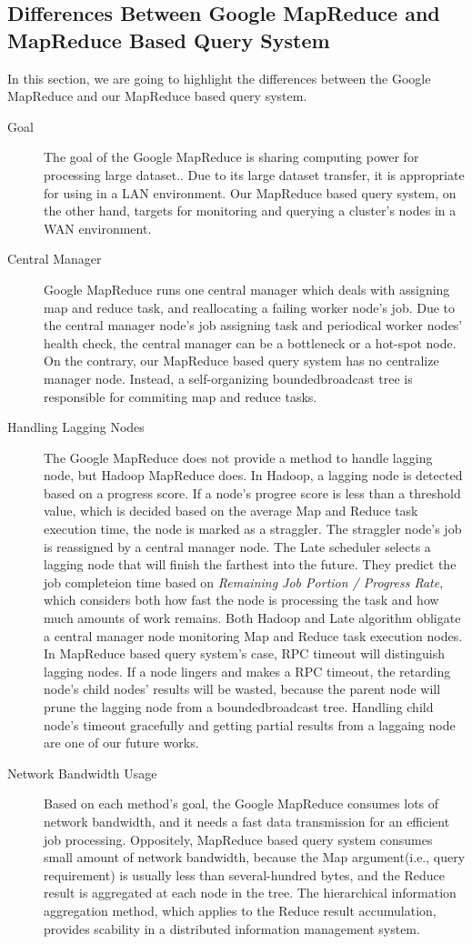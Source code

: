 \documentclass{acm_proc_article-sp}
\begin{document}
\subsection{Differences Between Google MapReduce and MapReduce Based Query System}
In this section, we are going to highlight the differences between the Google MapReduce and our MapReduce based query system.
\begin{description}
\item[Goal]The goal of the Google MapReduce is sharing computing power for processing large dataset.\cite{google_mapreduce}. Due to its large dataset transfer, it is appropriate for using in a LAN environment.
Our MapReduce based query system, on the other hand, targets for monitoring and querying a cluster's nodes in a WAN environment.
\item[Central Manager]Google MapReduce runs one central manager which deals with assigning map and reduce task, and reallocating a failing worker node's job.
Due to the central manager node's job assigning task and periodical worker nodes' health check, the central manager can be a bottleneck or a hot-spot node. 
On the contrary, our MapReduce based query system has no centralize manager node. Instead, a self-organizing boundedbroadcast tree is responsible for commiting map and reduce tasks.
\item[Handling Lagging Nodes]The Google MapReduce does not provide a method to handle lagging node, but Hadoop MapReduce does. In Hadoop, a lagging node is detected based on a progress score.
If a node's progree score is less than a threshold value, which is decided based on the average Map and Reduce task execution time, the node is marked as a straggler. The straggler node's job is reassigned by a central manager node.\cite{hadoop}
The Late scheduler\cite{late} selects a lagging node that will finish the farthest into the future. They predict the job completeion time based on \textit{Remaining Job Portion / Progress Rate}, which considers both
how fast the node is processing the task and how much amounts of work remains.
Both Hadoop and Late algorithm obligate a central manager node monitoring Map and Reduce task execution nodes. 
In MapReduce based query system's case, RPC timeout will distinguish lagging nodes. If a node lingers and makes a RPC timeout, the retarding node's child nodes' results will be wasted, 
because the parent node will prune the lagging node from a boundedbroadcast tree. Handling child node's timeout gracefully and getting partial results from a laggaing node are one of our future works.
\item[Network Bandwidth Usage]Based on each method's goal, the Google MapReduce consumes lots of network bandwidth, and it needs a fast data transmission for an efficient job processing. 
Oppositely, MapReduce based query system consumes small amount of network bandwidth, because the Map argument(i.e., query requirement) is usually less than several-hundred bytes, and the Reduce result is aggregated at each node in the tree.
The hierarchical information aggregation method, which applies to the Reduce result accumulation, provides scability in a distributed information management system.\cite{astrobe} \cite{treedatamanage}
\end{description} 
\end{document}
